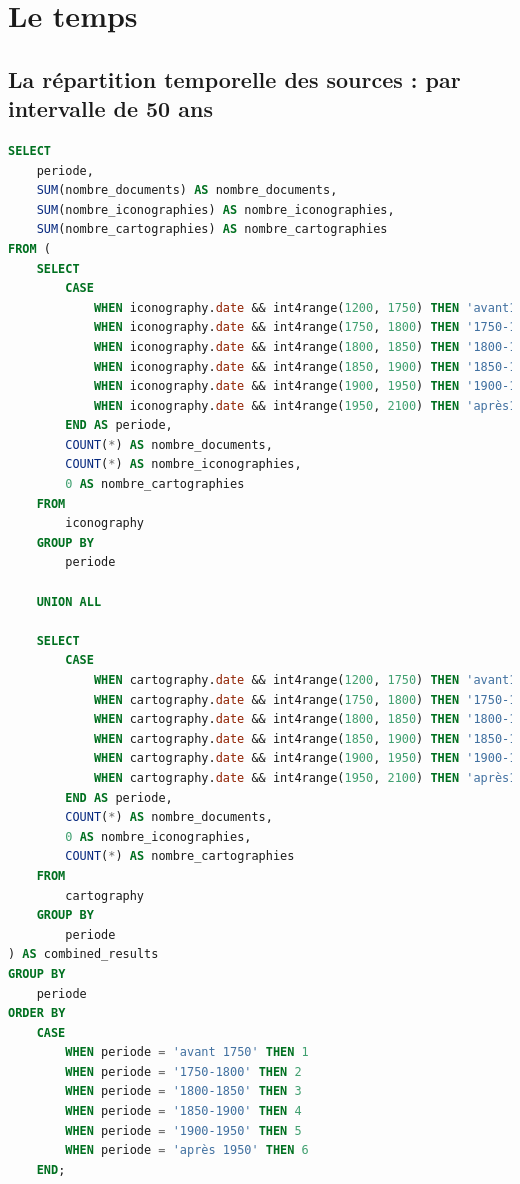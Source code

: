 \section{Le temps}
\subsection{La répartition temporelle des sources : par intervalle de 50 ans}
\begin{lstlisting}[language=SQL, caption=Requête SQL pour nombre de sources par date (50 ans)]
SELECT
    periode,
    SUM(nombre_documents) AS nombre_documents,
    SUM(nombre_iconographies) AS nombre_iconographies,
    SUM(nombre_cartographies) AS nombre_cartographies
FROM (
    SELECT 
        CASE 
            WHEN iconography.date && int4range(1200, 1750) THEN 'avant1750'
            WHEN iconography.date && int4range(1750, 1800) THEN '1750-1800'
            WHEN iconography.date && int4range(1800, 1850) THEN '1800-1850'
            WHEN iconography.date && int4range(1850, 1900) THEN '1850-1900'
            WHEN iconography.date && int4range(1900, 1950) THEN '1900-1950'
            WHEN iconography.date && int4range(1950, 2100) THEN 'après1950'
        END AS periode,
        COUNT(*) AS nombre_documents,
        COUNT(*) AS nombre_iconographies,
        0 AS nombre_cartographies
    FROM 
        iconography
    GROUP BY 
        periode

    UNION ALL

    SELECT 
        CASE 
            WHEN cartography.date && int4range(1200, 1750) THEN 'avant1750'
            WHEN cartography.date && int4range(1750, 1800) THEN '1750-1800'
            WHEN cartography.date && int4range(1800, 1850) THEN '1800-1850'
            WHEN cartography.date && int4range(1850, 1900) THEN '1850-1900'
            WHEN cartography.date && int4range(1900, 1950) THEN '1900-1950'
            WHEN cartography.date && int4range(1950, 2100) THEN 'après1950'
        END AS periode,
        COUNT(*) AS nombre_documents,
        0 AS nombre_iconographies,
        COUNT(*) AS nombre_cartographies
    FROM 
        cartography
    GROUP BY 
        periode
) AS combined_results
GROUP BY 
    periode
ORDER BY 
    CASE 
        WHEN periode = 'avant 1750' THEN 1
        WHEN periode = '1750-1800' THEN 2
        WHEN periode = '1800-1850' THEN 3
        WHEN periode = '1850-1900' THEN 4
        WHEN periode = '1900-1950' THEN 5
        WHEN periode = 'après 1950' THEN 6
    END; \end{lstlisting}
    
